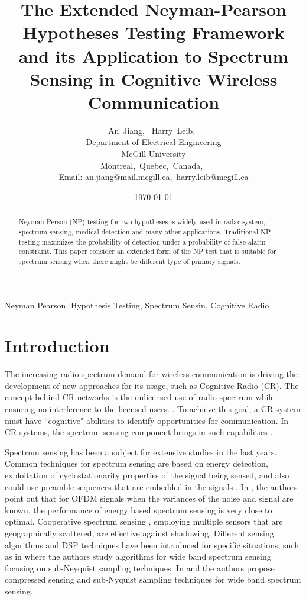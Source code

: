 \documentclass[12pt,journal,a4paper,twoside,onecolumn,draft]{IEEEtran}
\author{An~Jiang,~
        Harry~Leib,~\\
          Department of Electrical Engineering\\
          McGill University\\
          Montreal,~Quebec,~Canada,~\\
          Email: an.jiang@mail.mcgill.ca,~harry.leib@mcgill.ca
}
\title{The Extended Neyman-Pearson Hypotheses Testing Framework and its Application to Spectrum Sensing in Cognitive Wireless Communication}
\date{\today}
\begin{document}
\begin{spacing}{2.5}
\maketitle
\begin{abstract}
Neyman Person (NP) testing for two hypotheses is widely used in radar system, spectrum sensing, medical detection and many other applications. Traditional NP testing maximizes the probability of detection under a probability of false alarm constraint. This paper consider an extended form of the NP test that is suitable for spectrum sensing when there might be different type of primary signals.
\end{abstract}

\begin{IEEEkeywords}
Neyman Pearson, Hypothesis Testing, Spectrum Sensin, Cognitive Radio
\end{IEEEkeywords}

\section{Introduction}
The increasing radio spectrum demand for wireless communication is driving the development of new approaches for its usage, such as Cognitive Radio (CR)\cite{a001}. The concept behind CR networks is the unlicensed use of radio spectrum while ensuring no interference to the licensed users. \cite{goldsmith2009breaking}.
To achieve this goal, a CR system must have ``cognitive" abilities to identify opportunities for communication\cite{buddhikot2007understanding}. In CR systems, the spectrum sensing component brings in such capabilities \cite{tandra2009spectrum}.

 Spectrum sensing has been a subject for extensive studies in the last years\cite{axell2012spectrum}. Common techniques for spectrum sensing are based on energy detection, exploitation of cyclostationarity properties of  the signal being sensed, and also could use preamble sequences that are embedded in the signals \cite{cabric2004implementation}.  In \cite{axell2011optimal}, the authors point out that for OFDM signals when the variances of the noise and signal are known, the performance of energy based spectrum sensing is very close to optimal. Cooperative spectrum sensing \cite{ganesan2005cooperative}, employing multiple sensors that are geographically scattered, are effective against shadowing.
Different sensing algorithms and DSP techniques have been introduced for specific situations, such as in \cite{tian2007compressed} where the authors study algorithms for wide band spectrum sensing focusing on sub-Neyquist sampling techniques. In  \cite{sun2013wideband} and  \cite{sun2013wideband2} the authors propose compressed sensing and sub-Nyquist sampling techniques for wide band spectrum sensing.


\end{spacing}
\end{document}

